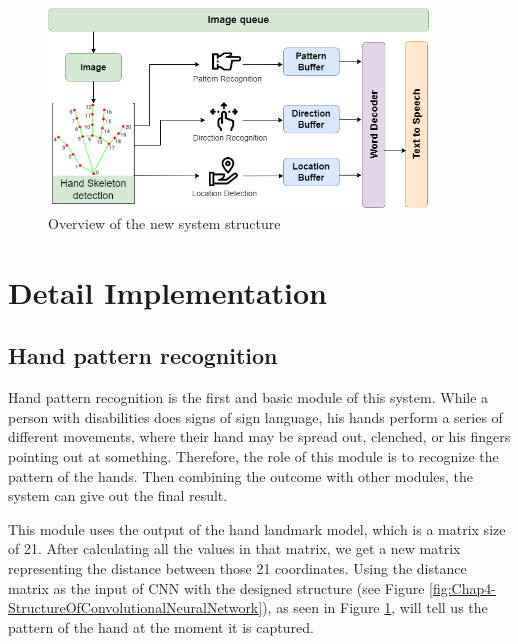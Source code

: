 \begin{figure}[H]
	\centering
	\includegraphics[width=0.9\textwidth]{img/Chap4/OverviewOfTheSystemModules-New.png}
	\caption{Overview of the new system structure}
	\label{fig:Chap4-OverviewOfTheSystemModules-New}
\end{figure}

\section{Detail Implementation}\label{sec:DetailImplementation}

\subsection{Hand pattern recognition}

Hand pattern recognition is the first and basic module of this system. While a person with disabilities does signs of sign language, his hands perform a series of different movements, where their hand may be spread out, clenched, or his fingers pointing out at something. Therefore, the role of this module is to recognize the pattern of the hands. Then combining the outcome with other modules, the system can give out the final result.

This module uses the output of the hand landmark model, which is a matrix size of 21. After calculating all the values in that matrix, we get a new matrix representing the distance between those 21 coordinates. Using the distance matrix as the input of CNN with the designed structure (see Figure \ref{fig:Chap4-StructureOfConvolutionalNeuralNetwork}), as seen in Figure \ref{fig:Chap4-OverviewOfTheSystemModules-New}, will tell us the pattern of the hand at the moment it is captured.

